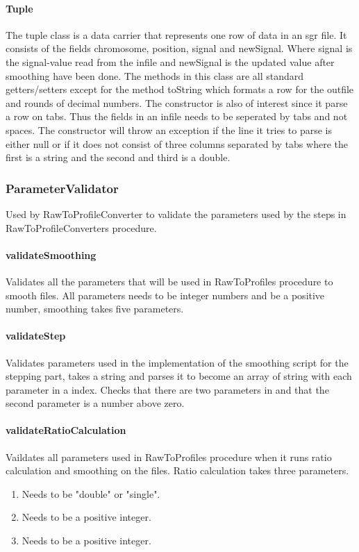 \paragraph{Tuple}
The tuple class is a data carrier that represents one row of data in an sgr file. It consists of the fields chromosome, position, signal and newSignal. Where signal is the signal-value read from the infile and newSignal is the updated value after smoothing have been done.
The methods in this class are all standard getters/setters except for the method toString which formats a row for the outfile and rounds of decimal numbers. The constructor is also of interest since it parse a row on tabs. Thus the fields in an infile needs to be seperated by tabs and not spaces. The constructor will throw an exception if the line it tries to parse is either null or if it does not consist of three columns separated by tabs where the first is a string and the second and third is a double.


\subsubsection{ParameterValidator}

Used by RawToProfileConverter to validate the parameters used by the steps in RawToProfileConverters procedure.

\paragraph{validateSmoothing} 
Validates all the parameters that will be used in RawToProfiles procedure to smooth files. All parameters needs to be integer numbers and be a positive number, smoothing takes five parameters. 


\paragraph{validateStep}
Validates parameters used in the implementation of the smoothing script for the stepping part, takes a string and parses it to become an array of string with each parameter in a index. Checks that there are two parameters in and that the second parameter is a number above zero.

\paragraph{validateRatioCalculation}
Vaildates all parameters used in RawToProfiles procedure when it runs ratio calculation and 
smoothing on the files. Ratio calculation takes three parameters.
\begin{enumerate}
\item Needs to be "double" or "single".
\item Needs to be a positive integer.
\item Needs to be a positive integer.
\end{enumerate}

